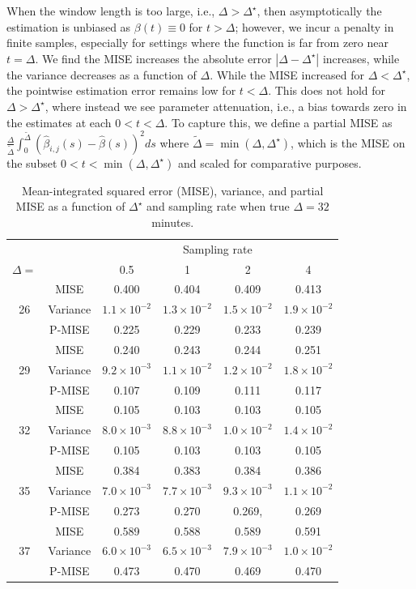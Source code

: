 \documentclass[12pt]{amsart}
\begin{document}
When the window length is too large, i.e., $\Delta > \Delta^\star$, then asymptotically the estimation is unbiased as $\beta(t) \equiv 0$ for $t > \Delta$; however, we incur a penalty in finite samples, especially for settings where the function is far from zero near $t = \Delta$.  We find the MISE increases the absolute error $|\Delta - \Delta^\star|$ increases, while the variance decreases as a function of $\Delta$.  While the MISE increased for $\Delta < \Delta^\star$, the pointwise estimation error remains low for $t < \Delta$.  This does not hold for $\Delta > \Delta^\star$, where instead we see parameter attenuation, i.e., a bias towards zero in the estimates at each $0 < t< \Delta$.  To capture this, we define a partial MISE as $\frac{\Delta}{\tilde \Delta} \int_0^{\tilde \Delta} ( \hat \beta_{i,j} (s) - \hat \beta (s) )^2 ds$ where $\tilde \Delta = \min(\Delta, \Delta^\star)$, which is the MISE on the subset $0<t< \min (\Delta, \Delta^\star)$ and scaled for comparative purposes.

\begin{table}[!th]
\begin{tabular}{c | c c c c c}
& & \multicolumn{4}{c}{Sampling rate} \\ \cline{3-6}
$\Delta=$ & & 0.5 & 1 & 2 & 4 \\ \hline
\multirow{3}{*}{26} & MISE & 0.400 & 0.404 & 0.409 & 0.413 \\
 & Variance & $1.1 \times 10^{-2}$ & $1.3 \times 10^{-2}$ & $1.5 \times 10^{-2}$ & $1.9 \times 10^{-2}$ \\
  & P-MISE & 0.225 & 0.229 & 0.233 & 0.239 \\ \hline
\multirow{3}{*}{29} & MISE & 0.240 & 0.243 & 0.244 & 0.251 \\
 & Variance & $9.2 \times 10^{-3}$ & $1.1 \times 10^{-2}$ & $1.2 \times 10^{-2}$ & $1.8 \times 10^{-2}$ \\
  & P-MISE & 0.107 & 0.109 & 0.111 & 0.117 \\ \hline
\multirow{3}{*}{32} & MISE & 0.105 & 0.103 & 0.103 & 0.105 \\
 & Variance & $8.0 \times 10^{-3}$ & $8.8 \times 10^{-3}$ & $1.0 \times 10^{-2}$ & $1.4 \times 10^{-2}$ \\
  & P-MISE & 0.105 & 0.103 & 0.103 & 0.105 \\\hline
\multirow{3}{*}{35} & MISE & 0.384 & 0.383 & 0.384 & 0.386 \\
 & Variance & $7.0 \times 10^{-3}$ & $7.7 \times 10^{-3}$ & $9.3 \times 10^{-3}$ & $1.1 \times 10^{-2}$ \\
  & P-MISE & 0.273 & 0.270 & 0.269, & 0.269 \\\hline
\multirow{3}{*}{37} & MISE & 0.589 & 0.588 & 0.589 & 0.591 \\
 & Variance & $6.0 \times 10^{-3}$ & $6.5 \times 10^{-3}$ & $7.9 \times 10^{-3}$ & $1.0 \times 10^{-2}$ \\
  & P-MISE & 0.473 & 0.470 & 0.469 & 0.470 \\\hline
\end{tabular}
\caption{Mean-integrated squared error (MISE), variance, and partial MISE as a function of $\Delta^\star$ and sampling rate when true $\Delta = 32$ minutes.}
\label{tab:mise}
\end{table}
\end{document}
